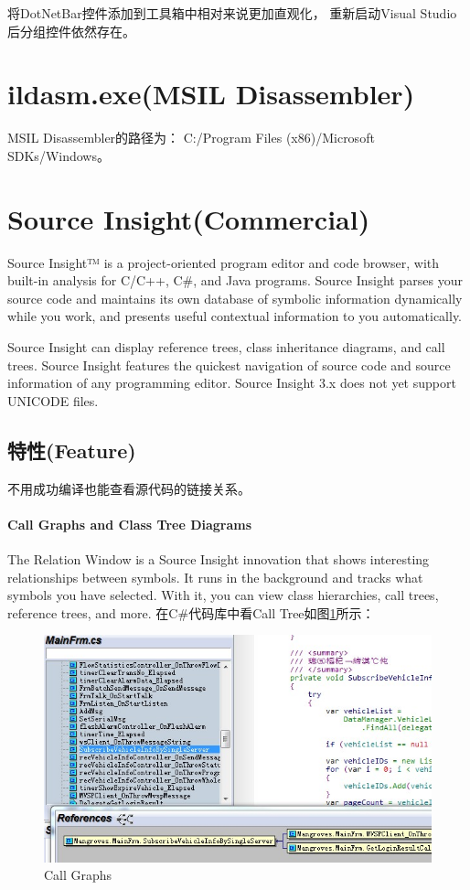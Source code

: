\documentclass{book}
\begin{document}
将DotNetBar控件添加到工具箱中相对来说更加直观化，
重新启动Visual Studio后分组控件依然存在。

\section{ildasm.exe(MSIL Disassembler)}

MSIL Disassembler的路径为：
C:/Program Files (x86)/Microsoft SDKs/Windows。

\section{Source Insight(Commercial)}

Source Insight™ is a project-oriented program editor and code browser, 
with built-in analysis for C/C++, C\#, and Java programs. 
Source Insight parses your source code and maintains its 
own database of symbolic information dynamically while you work, 
and presents useful contextual information to you automatically.

Source Insight can display reference trees, class inheritance diagrams, 
and call trees. Source Insight features the quickest navigation of source 
code and source information of any programming editor.
Source Insight 3.x does not yet support UNICODE files.

\subsection{特性(Feature)}

不用成功编译也能查看源代码的链接关系。

\paragraph{Call Graphs and Class Tree Diagrams}

The Relation Window is a Source Insight innovation that 
shows interesting relationships between symbols. 
It runs in the background and tracks what symbols you have selected. 
With it, you can view class hierarchies, call trees, reference trees, and more.
在C\#代码库中看Call Tree如图\ref{fig:FunctionTree}所示：

\begin{figure}[htbp]
	\centering
	\includegraphics[scale=0.8]{FunctionTree.jpg}
	\caption{Call Graphs}
	\label{fig:FunctionTree}
\end{figure}
\end{document}
